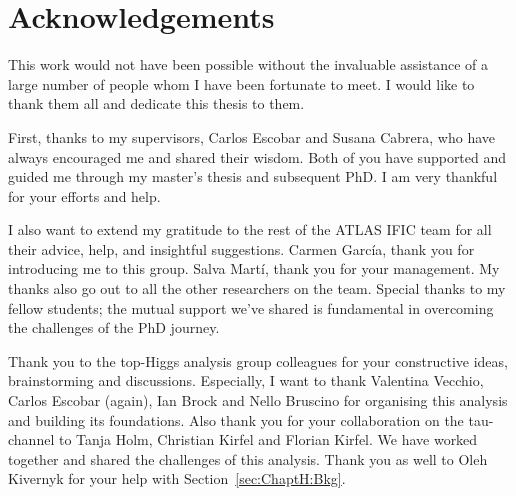 
\chapter*{Acknowledgements}
 

This work would not have been possible without the invaluable assistance of a large number of people whom I have been fortunate to meet. I would like to thank them all and dedicate this thesis to them. 

First, thanks to my supervisors, Carlos Escobar and Susana Cabrera, who have always encouraged me and shared their wisdom. Both of you have supported and guided me through my master's thesis and subsequent PhD. I am very thankful for your efforts and help. %

I also want to extend my gratitude to the rest of the ATLAS IFIC team for all their advice, help, and insightful suggestions. Carmen García, thank you for introducing me to this group. Salva Martí, thank you for your management. 
My thanks also go out to all the other researchers on the team. Special thanks to my fellow students; the mutual support we've shared is fundamental in overcoming the challenges of the PhD journey. %


Thank you to the top-Higgs analysis group colleagues for your constructive ideas, brainstorming and discussions. 
Especially, I want to thank Valentina Vecchio, Carlos Escobar (again), Ian Brock and Nello Bruscino for organising 
this analysis and building its foundations. Also thank you for your collaboration on the tau-channel to 
Tanja Holm, Christian Kirfel and Florian Kirfel. We have worked together and shared the challenges of this analysis.
Thank you as well to Oleh Kivernyk for your help with Section~\ref{sec:ChaptH:Bkg}. 



